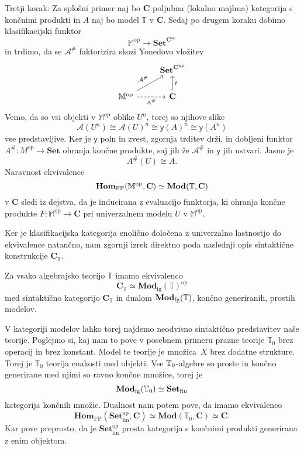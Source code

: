 \documentclass[../kategoricna_logika.tex]{subfiles}
\begin{document}
\begin{dokaz}
  Tretji korak: Za splošni primer naj bo $\mathbf{C}$ poljubna (lokalno majhna) kategorija
  s končnimi produkti in $A$ naj bo model $\mathbb{T}$ v $\mathbf{C}$.
  Sedaj po drugem koraku dobimo klasifikacijski funktor
  \[ \mathbb{M}^{\mathrm{op}} \to \mathbf{Set}^{\mathbf{C}^{\mathrm{op}}}\]
  in trdimo, da se $\mathcal{A}^{\#}$ faktorizira skozi Yonedovo vložitev
  \begin{equation*}
    \begin{tikzcd}
      & \mathbf{Set}^{\mathbf{C}^{\mathrm{op}}} \\
      \mathbb{M}^{\mathrm{op}} \ar[ur, "\mathcal{A}^{\#}"] \ar[r, dashed, "A^{\#}"'] &
      \mathbf{C} \ar[u, hook, "\mathsf{y}"']
    \end{tikzcd}
  \end{equation*}
  Vemo, da so vsi objekti v $\mathbb{M}^{\mathrm{op}}$ oblike $U^n$, torej so njihove slike
  \[ \mathcal{A}(U^n) \cong \mathcal{A}(U)^n \cong \mathsf{y}(A)^n \cong \mathsf{y}(A^n)\]
  vse predstavljive. Ker je $\mathsf{y}$ poln in zvest, zgornja trditev drži, in
  dobljeni funktor $A^{\#} : M^{\mathrm{op}} \to \mathbf{Set}$ ohranja končne produkte, saj jih
  že $\mathcal{A}^{\#}$ in $\mathsf{y}$ jih ustvari. Jasno je
  \[ A^{\#}(U) \cong A.\]
  Naravnost ekvivalence
  \[ \mathbf{Hom}_{\mathrm{FP}}(\mathbb{M}^{\mathrm{op}},\mathbf{C}) \simeq \mathbf{Mod}(\mathbb{T}, \mathbf{C})\]
  v $\mathbf{C}$ sledi iz dejstva, da je inducirana z evaluacijo
  funktorja, ki ohranja končne produkte $F : \mathbb{M}^{\mathrm{op}} \to \mathbf{C}$
  pri univerzalnem modelu $U$ v $\mathbb{M}^{\mathrm{op}}$.
\end{dokaz}
Ker je klasifikacijska kategorija enolično določena z univerzalno lastnostjo
do ekvivalence natančno, nam zgornji izrek direktno poda naslednji opis sintaktične
konstrukcije $\mathbf{C}_{\mathbb{T}}$.
\begin{posledica}\label{posledica:logična-dualnost}
Za vsako algebrajsko teorijo \(\mathbb{T}\) imamo ekvivalenco
\[ \mathbf{C}_{\mathbb{T}} \simeq \mathbf{Mod}_{\mathrm{fg}}(\mathbb{T})^{\mathrm{op}} \]
med sintaktično kategorijo \(\mathbf{C}_{\mathbb{T}}\) in dualom
\(\mathbf{Mod}_{\mathrm{fg}}(\mathbb{T})\), končno generiranih,
prostih modelov.
\end{posledica}
V kategoriji modelov lahko torej najdemo neodvisno sintaktično
predstavitev naše teorije.
Poglejmo si, kaj nam to pove v posebnem primeru prazne teorije \(\mathbb{T}_0\)
brez operacij in brez konstant. Model te teorije je množica~\(X\)
brez dodatne strukture. Torej je \(\mathbb{T}_0\) teorija enakosti
med objekti.
Vse $\mathbb{T}\textsubscript{0}$-algebre so proste in končno generirane med njimi
so ravno končne množice, torej je
\[ \mathbf{Mod}_{\mathrm{fg}}(\mathbb{T}_0) \simeq \mathbf{Set} _{\mathrm{fin}} \]
kategorija končnih množic. Dualnost nam potem pove, da
imamo ekvivalenco
\[ \mathbf{Hom}_{\mathrm{FP}}(\mathbf{Set}_{\mathrm{fin}}^{\mathrm{op}}, \mathbf{C}) \simeq
   \mathbf{Mod}(\mathbb{T}_0, \mathbf{C}) \simeq \mathbf{C}. \]
Kar pove preprosto, da je \(\mathbf{Set}_{\mathrm{fin}}^{\mathrm{op}}\)
prosta kategorija s končnimi produkti generirana z enim objektom.
\end{document}
